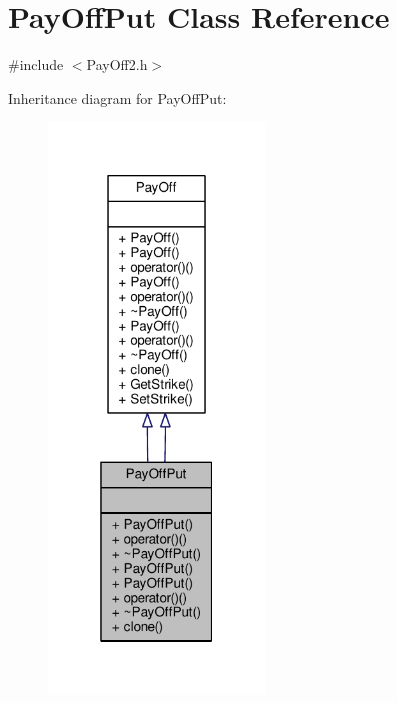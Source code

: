 \hypertarget{classPayOffPut}{}\section{Pay\+Off\+Put Class Reference}
\label{classPayOffPut}


{\ttfamily \#include $<$Pay\+Off2.\+h$>$}



Inheritance diagram for Pay\+Off\+Put\+:
\nopagebreak
\begin{figure}[H]
\begin{center}
\leavevmode
\includegraphics[width=163pt]{classPayOffPut__inherit__graph}
\end{center}
\end{figure}


